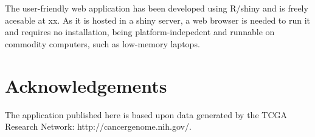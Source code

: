 \documentclass{article}
\begin{document}
The user-friendly web application has been developed using R/shiny and is freely acesable at xx. As it is hosted in a shiny server, a web browser is needed to run it and requires no installation, being platform-indepedent and runnable on commodity computers, such as low-memory laptops.

\section{Acknowledgements}
The application published here is based upon data generated by the TCGA Research Network: http://cancergenome.nih.gov/.


\end{document}
